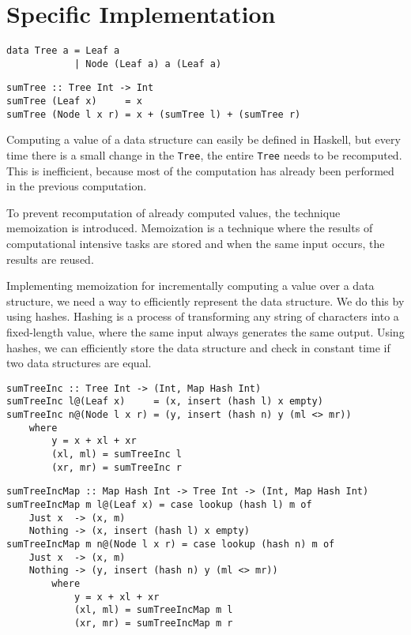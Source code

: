 \chapter{Specific Implementation}

\begin{verbatim}
data Tree a = Leaf a
            | Node (Leaf a) a (Leaf a)
\end{verbatim}

\begin{verbatim}
sumTree :: Tree Int -> Int
sumTree (Leaf x)     = x
sumTree (Node l x r) = x + (sumTree l) + (sumTree r)
\end{verbatim}

Computing a value of a data structure can easily be defined in Haskell, but every time there is a small change in the \texttt{Tree}, the entire \texttt{Tree} needs to be recomputed. This is inefficient, because most of the computation has already been performed in the previous computation. 

To prevent recomputation of already computed values, the technique memoization is introduced. Memoization is a technique where the results of computational intensive tasks are stored and when the same input occurs, the results are reused. 


Implementing memoization for incrementally computing a value over a data structure, we need a way to efficiently represent the data structure. We do this by using hashes. Hashing is a process of transforming any string of characters into a fixed-length value, where the same input always generates the same output. Using hashes, we can efficiently store the data structure and check in constant time if two data structures are equal.

\begin{verbatim}
sumTreeInc :: Tree Int -> (Int, Map Hash Int)
sumTreeInc l@(Leaf x)     = (x, insert (hash l) x empty)
sumTreeInc n@(Node l x r) = (y, insert (hash n) y (ml <> mr))
    where
        y = x + xl + xr
        (xl, ml) = sumTreeInc l
        (xr, mr) = sumTreeInc r
\end{verbatim}


\begin{verbatim}
sumTreeIncMap :: Map Hash Int -> Tree Int -> (Int, Map Hash Int)
sumTreeIncMap m l@(Leaf x) = case lookup (hash l) m of
    Just x  -> (x, m) 
    Nothing -> (x, insert (hash l) x empty)
sumTreeIncMap m n@(Node l x r) = case lookup (hash n) m of
    Just x  -> (x, m)
    Nothing -> (y, insert (hash n) y (ml <> mr))
        where
            y = x + xl + xr
            (xl, ml) = sumTreeIncMap m l
            (xr, mr) = sumTreeIncMap m r
\end{verbatim}

